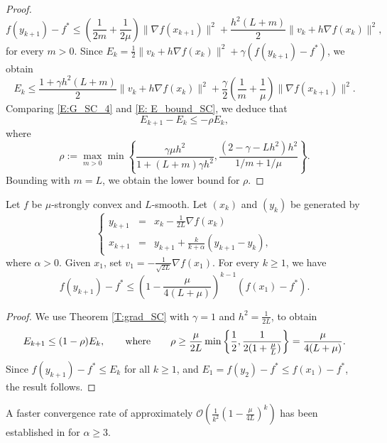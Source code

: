 \documentclass[onefignum,onetabnum]{siamart220329}
\newcommand{\qqbox}[1]{\qquad\hbox{#1}\qquad}
\begin{document}
\begin{proof}
$$f(y_{k+1}) - f^* \le \left( \frac{1}{2m} + \frac{1}{2\mu} \right)\| \nabla f(x_{k+1}) \|^2 +  \frac{h^2(L+m)}{2} \| v_k + h\nabla f(x_k) \|^2,$$
for every $m>0$. Since $E_k = \frac{1}{2}\| v_k + h\nabla f(x_k) \|^2 + \gamma\left( f(y_{k+1}) - f^* \right)$, we obtain
\begin{equation}\label{E: E_bound_SC}
E_k\le \frac{1 + \gamma h^2(L+m)}{2} \| v_k + h\nabla f(x_k) \|^2 
     + \frac{\gamma}{2} \left( \frac{1}{m} + \frac{1}{\mu} \right)\| \nabla f(x_{k+1}) \|^2.
\end{equation}
Comparing \eqref{E:G_SC_4} and \eqref{E: E_bound_SC}, we deduce that
$$E_{k+1} - E_k 
\le -\rho E_k,   
$$
where 
$$\rho:= \max_{m>0}\min\left\{ \frac{\gamma\mu h^2}{1 + (L+m)\gamma h^2},  \frac{(2-\gamma - Lh^2) h^2}{ 1/m + 1/\mu } \right\}.$$
Bounding with $m=L$, we obtain the lower bound for $\rho$.\end{proof}


\begin{corollary}
Let $f$ be $\mu$-strongly convex and $L$-smooth. Let $(x_k)$ and $(y_k)$ be generated by
$$\left\{\begin{array}{ccl}
y_{k+1} &=& x_k - \frac{1}{2L}\nabla f(x_k) \\
x_{k+1} &=& y_{k+1} + \frac{k}{k+\alpha}\left( y_{k+1} - y_k \right),
\end{array}
\right.$$
where $\alpha>0$. Given $x_1$, set $v_1 = -\frac{1}{\sqrt{2L}}\nabla f(x_1)$. For every $k\ge 1$, we have
$$ f(y_{k+1}) - f^* \le \left( 1 - \frac{\mu}{4(L+\mu)} \right)^{k-1} \left( f(x_1)-f^* \right).$$
\end{corollary}


\begin{proof}
We use Theorem \ref{T:grad_SC} with $\gamma=1$ and $h^2 = \frac{1}{2L}$, to obtain
$$E_{k+1}\le(1-\rho)E_k,\qqbox{where}\rho \ge \frac{\mu}{2L}\min\left\{ \frac{1}{2},  \frac{1}{2( 1 + \frac{\mu}{L}) }  \right\}=\frac{\mu}{4(L+\mu)} .$$
Since $f(y_{k+1}) - f^* \le E_k$ for all $k\ge 1$, and $E_1=f(y_2)-f^*\le f(x_1) - f^*$, the result follows.
\end{proof}

\begin{remark}
A faster convergence rate of approximately $\mathcal{O}\left( \frac{1}{k^2}\left( 1 - \frac{\mu}{4L} \right)^k \right)$ has been established in \cite{Shi_2024,Bao_2023} for $\alpha\ge 3$.  
\end{remark}




\end{document}
